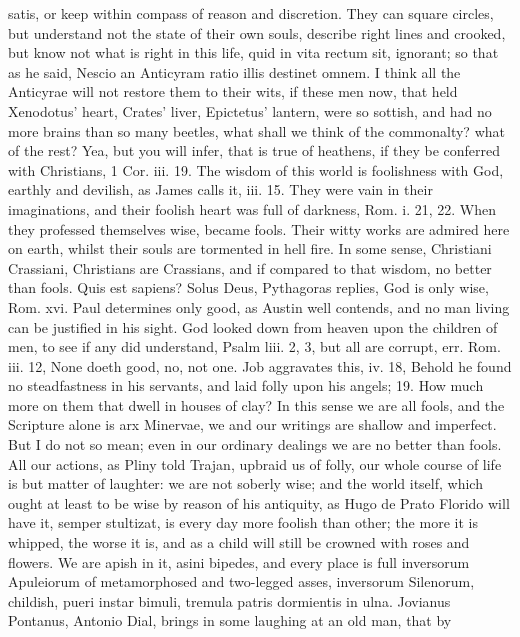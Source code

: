 {satis, or keep within compass of reason and discretion. They can square
circles, but understand not the state of their own souls, describe
right lines and crooked, \etc but know not what is right in this life,
quid in vita rectum sit, ignorant; so that as he said, Nescio an
Anticyram ratio illis destinet omnem. I think all the Anticyrae will
not restore them to their wits, if these men now, that held 
Xenodotus' heart, Crates' liver, Epictetus' lantern, were so sottish,
and had no more brains than so many beetles, what shall we think of the
commonalty? what of the rest?
Yea, but you will infer, that is true of heathens, if they be conferred
with Christians, 1 Cor. iii. 19. The wisdom of this world is
foolishness with God, earthly and devilish, as James calls it, iii. 15.
They were vain in their imaginations, and their foolish heart was full
of darkness, Rom. i. 21, 22. When they professed themselves wise,
became fools. Their witty works are admired here on earth, whilst their
souls are tormented in hell fire. In some sense, Christiani Crassiani,
Christians are Crassians, and if compared to that wisdom, no better
than fools. Quis est sapiens? Solus Deus, Pythagoras replies, God
is only wise, Rom. xvi. Paul determines only good, as Austin well
contends, and no man living can be justified in his sight. God looked
down from heaven upon the children of men, to see if any did
understand, Psalm liii. 2, 3, but all are corrupt, err. Rom. iii. 12,
None doeth good, no, not one. Job aggravates this, iv. 18, Behold he
found no steadfastness in his servants, and laid folly upon his angels;
19. How much more on them that dwell in houses of clay? In this sense
we are all fools, and the Scripture alone is arx Minervae, we and
our writings are shallow and imperfect. But I do not so mean; even in
our ordinary dealings we are no better than fools. All our actions, as
Pliny told Trajan, upbraid us of folly, our whole course of life
is but matter of laughter: we are not soberly wise; and the world
itself, which ought at least to be wise by reason of his antiquity, as
Hugo de Prato Florido will have it, semper stultizat, is every day
more foolish than other; the more it is whipped, the worse it is, and
as a child will still be crowned with roses and flowers. We are apish
in it, asini bipedes, and every place is full inversorum Apuleiorum of
metamorphosed and two-legged asses, inversorum Silenorum, childish,
pueri instar bimuli, tremula patris dormientis in ulna. Jovianus
Pontanus, Antonio Dial, brings in some laughing at an old man, that by
}
